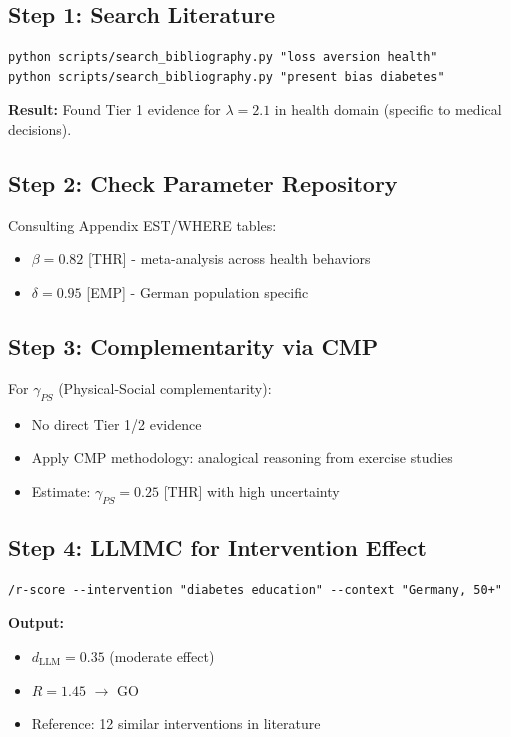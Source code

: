 \subsection{Step 1: Search Literature}

\begin{verbatim}
python scripts/search_bibliography.py "loss aversion health"
python scripts/search_bibliography.py "present bias diabetes"
\end{verbatim}

\textbf{Result:} Found Tier 1 evidence for $\lambda = 2.1$ in health domain (specific to medical decisions).

\subsection{Step 2: Check Parameter Repository}

Consulting Appendix EST/WHERE tables:
\begin{itemize}[nosep]
    \item $\beta = 0.82$ [THR] - meta-analysis across health behaviors
    \item $\delta = 0.95$ [EMP] - German population specific
\end{itemize}

\subsection{Step 3: Complementarity via CMP}

For $\gamma_{PS}$ (Physical-Social complementarity):
\begin{itemize}[nosep]
    \item No direct Tier 1/2 evidence
    \item Apply CMP methodology: analogical reasoning from exercise studies
    \item Estimate: $\gamma_{PS} = 0.25$ [THR] with high uncertainty
\end{itemize}

\subsection{Step 4: LLMMC for Intervention Effect}

\begin{verbatim}
/r-score --intervention "diabetes education" --context "Germany, 50+"
\end{verbatim}

\textbf{Output:}
\begin{itemize}[nosep]
    \item $d_{\text{LLM}} = 0.35$ (moderate effect)
    \item $R = 1.45$ $\rightarrow$ GO
    \item Reference: 12 similar interventions in literature
\end{itemize}


